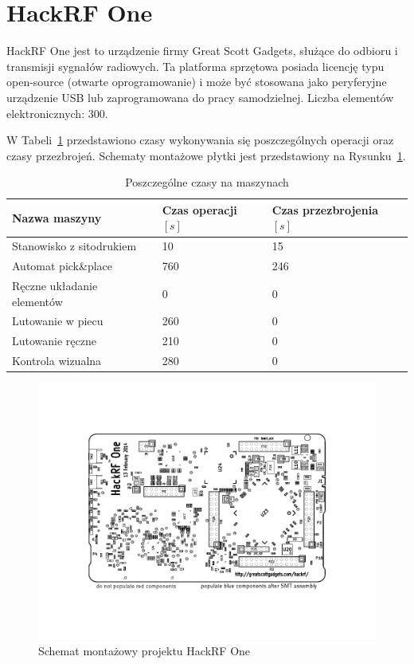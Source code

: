 \newpage
\section{HackRF One}
HackRF One jest to urządzenie firmy Great Scott Gadgets, służące do odbioru i transmisji sygnałów radiowych. Ta platforma sprzętowa posiada licencję typu open-source (otwarte oprogramowanie) i może być stosowana jako peryferyjne urządzenie USB lub zaprogramowana do pracy samodzielnej.
Liczba elementów elektronicznych: 300.

\breakparagraph{}
W Tabeli~\ref{hackrf:tab} przedstawiono czasy wykonywania się poszczególnych operacji oraz czasy przezbrojeń. Schematy montażowe płytki jest przedstawiony na Rysunku~\ref{hackrf:sche}.

\begin{table}[H]
	\centering
	\caption{Poszczególne czasy na maszynach}
	\begin{tabular}{lll}
		\toprule
		Nazwa maszyny                 & Czas operacji $[s]$ & Czas przezbrojenia $[s]$ \\
		\midrule
		Stanowisko z sitodrukiem      & 10                  & 15                       \\
		Automat pick\&place           & 760                 & 246                      \\
		Ręczne układanie elementów & 0                   & 0                        \\
		Lutowanie w piecu             & 260                 & 0                        \\
		Lutowanie ręczne             & 210                 & 0                        \\
		Kontrola wizualna             & 280                 & 0                        \\
		\bottomrule
	\end{tabular}
	\label{hackrf:tab}
\end{table}

\begin{figure}[H]
	\centering
	\includegraphics[clip, trim=1.5cm 2.5cm 1.5cm 2.5cm]{chapters/chapter5/hackrf-one-assembly.pdf}
	\caption{Schemat montażowy projektu HackRF One}
	\label{hackrf:sche}
\end{figure}


